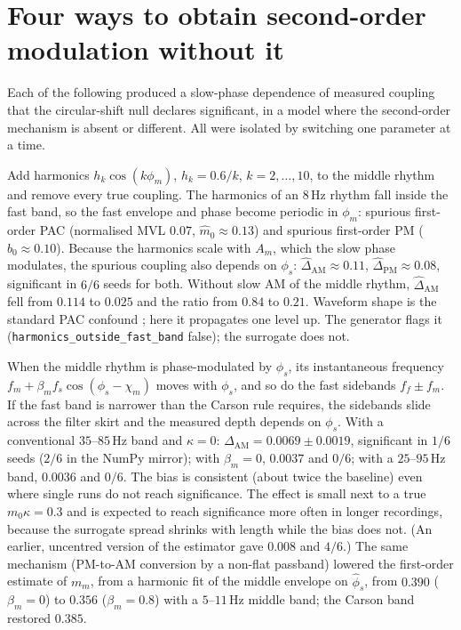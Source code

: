 \section{Four ways to obtain second-order modulation without it}
\label{sec:som-failures}
Each of the following produced a slow-phase dependence of measured
coupling that the circular-shift null declares significant, in a model
where the second-order mechanism is absent or different. All were
isolated by switching one parameter at a time.

\begin{caution}
Add harmonics $h_k\cos(k\phi_m)$, $h_k=0.6/k$, $k=2,\dots,10$, to the
middle rhythm and remove every true coupling. The harmonics of an $8$\,Hz
rhythm fall inside the fast band, so the fast envelope and phase become
periodic in $\phi_m$: spurious first-order PAC (normalised MVL $0.07$,
$\hat m_0\approx0.13$) and spurious first-order PM ($\hat b_0\approx0.10$). Because
the harmonics scale with $A_m$, which the slow phase modulates, the
spurious coupling also depends on $\phi_s$: $\hat\Delta_{\mathrm{AM}}\approx0.11$,
$\hat\Delta_{\mathrm{PM}}\approx0.08$, significant in $6/6$ seeds for both. Without
slow AM of the middle rhythm, $\hat\Delta_{\mathrm{AM}}$ fell from $0.114$ to
$0.025$ and the ratio from $0.84$ to $0.21$. Waveform shape
is the standard PAC confound \cite{aru2015,cole2019}; here it propagates
one level up. The generator flags it
(\texttt{harmonics\_outside\_fast\_band} false); the surrogate does not.
\end{caution}

\begin{caution}
When the middle rhythm is phase-modulated by $\phi_s$, its instantaneous
frequency $f_m+\beta_mf_s\cos(\phi_s-\chi_m)$ moves with $\phi_s$, and so
do the fast sidebands $f_f\pm f_m$. If the fast band is narrower than the
Carson rule requires, the sidebands slide across the filter skirt and the
measured depth depends on $\phi_s$. With a conventional $35$--$85$\,Hz band
and $\kappa=0$: $\hat\Delta_{\mathrm{AM}}=0.0069\pm0.0019$, significant in
$1/6$ seeds ($2/6$ in the NumPy mirror); with $\beta_m=0$, $0.0037$ and
$0/6$; with a $25$--$95$\,Hz band, $0.0036$ and $0/6$. The bias is
consistent (about twice the baseline) even where single runs do not reach
significance. The effect is small next to a true $m_0\kappa=0.3$ and is
expected to reach significance more often in longer recordings, because
the surrogate spread shrinks with length while the bias does not. (An earlier, uncentred version of the estimator gave
$0.008$ and $4/6$.) The same
mechanism (PM-to-AM conversion by a non-flat passband) lowered the
first-order estimate of $m_m$, from a harmonic fit of the middle envelope
on $\hat\phi_s$, from $0.390$ ($\beta_m=0$) to $0.356$ ($\beta_m=0.8$) with a
$5$--$11$\,Hz middle band; the Carson band restored $0.385$.
\end{caution}

